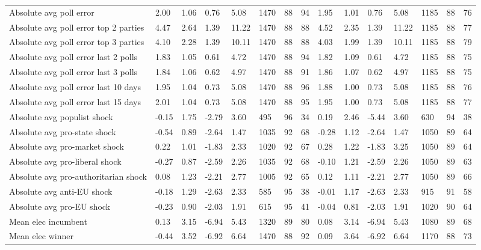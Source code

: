 \begin{longtable}{lllllllllllllll}
Absolute avg poll error & 2.00 & 1.06 & 0.76 & 5.08 & 1470 & 88 & 94 & 1.95 & 1.01 & 0.76 & 5.08 & 1185 & 88 & 76\\
Absolute avg poll error top 2 parties & 4.47 & 2.64 & 1.39 & 11.22 & 1470 & 88 & 88 & 4.52 & 2.35 & 1.39 & 11.22 & 1185 & 88 & 77\\
Absolute avg poll error top 3 parties & 4.10 & 2.28 & 1.39 & 10.11 & 1470 & 88 & 88 & 4.03 & 1.99 & 1.39 & 10.11 & 1185 & 88 & 79\\
\addlinespace
Absolute avg poll error last 2 polls & 1.83 & 1.05 & 0.61 & 4.72 & 1470 & 88 & 94 & 1.82 & 1.09 & 0.61 & 4.72 & 1185 & 88 & 75\\
Absolute avg poll error last 3 polls & 1.84 & 1.06 & 0.62 & 4.97 & 1470 & 88 & 91 & 1.86 & 1.07 & 0.62 & 4.97 & 1185 & 88 & 75\\
Absolute avg poll error last 10 days & 1.95 & 1.04 & 0.73 & 5.08 & 1470 & 88 & 96 & 1.88 & 1.00 & 0.73 & 5.08 & 1185 & 88 & 76\\
Absolute avg poll error last 15 days & 2.01 & 1.04 & 0.73 & 5.08 & 1470 & 88 & 95 & 1.95 & 1.00 & 0.73 & 5.08 & 1185 & 88 & 77\\
Absolute avg populist shock & -0.15 & 1.75 & -2.79 & 3.60 & 495 & 96 & 34 & 0.19 & 2.46 & -5.44 & 3.60 & 630 & 94 & 38\\
\addlinespace
Absolute avg pro-state shock & -0.54 & 0.89 & -2.64 & 1.47 & 1035 & 92 & 68 & -0.28 & 1.12 & -2.64 & 1.47 & 1050 & 89 & 64\\
Absolute avg pro-market shock & 0.22 & 1.01 & -1.83 & 2.33 & 1020 & 92 & 67 & 0.28 & 1.22 & -1.83 & 3.25 & 1050 & 89 & 64\\
Absolute avg pro-liberal shock & -0.27 & 0.87 & -2.59 & 2.26 & 1035 & 92 & 68 & -0.10 & 1.21 & -2.59 & 2.26 & 1050 & 89 & 63\\
Absolute avg pro-authoritarian shock & 0.08 & 1.23 & -2.21 & 2.77 & 1005 & 92 & 65 & 0.12 & 1.11 & -2.21 & 2.77 & 1050 & 89 & 66\\
Absolute avg anti-EU shock & -0.18 & 1.29 & -2.63 & 2.33 & 585 & 95 & 38 & -0.01 & 1.17 & -2.63 & 2.33 & 915 & 91 & 58\\
\addlinespace
Absolute avg pro-EU shock & -0.23 & 0.90 & -2.03 & 1.91 & 615 & 95 & 41 & -0.04 & 0.81 & -2.03 & 1.91 & 1020 & 90 & 64\\
Mean elec incumbent & 0.13 & 3.15 & -6.94 & 5.43 & 1320 & 89 & 80 & 0.08 & 3.14 & -6.94 & 5.43 & 1080 & 89 & 68\\
Mean elec winner & -0.44 & 3.52 & -6.92 & 6.64 & 1470 & 88 & 92 & 0.09 & 3.64 & -6.92 & 6.64 & 1170 & 88 & 73\\

\end{longtable}
